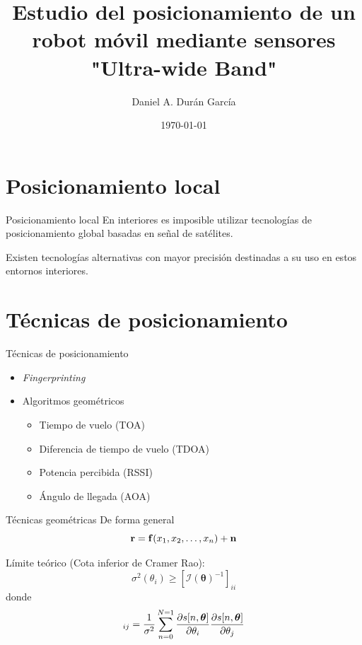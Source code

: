 \documentclass{beamer}
\title{Estudio del posicionamiento de un robot móvil mediante sensores "Ultra-wide Band"}
\date{\today}
\author{Daniel A. Durán García}
\begin{document}
  \maketitle

  \section{Posicionamiento local}
    \begin{frame}{Posicionamiento local}
      En interiores es imposible utilizar tecnologías de posicionamiento global basadas en señal de satélites.

      Existen tecnologías alternativas con mayor precisión destinadas a su uso en estos entornos interiores.
    \end{frame}

  \section{Técnicas de posicionamiento}

    \begin{frame}{Técnicas de posicionamiento}
    \begin{itemize}
      \item \textit{Fingerprinting}
      \item Algoritmos geométricos
      \begin{itemize}
        \item Tiempo de vuelo (TOA)
        \item Diferencia de tiempo de vuelo (TDOA)
        \item Potencia percibida (RSSI)
        \item Ángulo de llegada (AOA)
      \end{itemize}
    \end{itemize}
    \end{frame}

    \begin{frame}{Técnicas geométricas}
    De forma general
      \begin{equation*}\label{eq:geom}
        \vb{r} = \vb{f}(x_1, x_2, \ldots, x_n) + \vb{n}
      \end{equation*}

      Límite teórico (Cota inferior de Cramer Rao):
      \begin{equation*}
        \sigma^2(\theta_i) \geq [\mathcal{I}(\bm{\theta})^{-1}]_{ii}
      \end{equation*}
      donde
      \begin{equation*}
        [\mathcal{I}(\bm{\theta})]_{ij} = \frac{1}{\sigma^2} \sum_{n=0}^{N=1} \pdv{s[n,\bm{\theta}]}{\theta_i}\pdv{s[n,\bm{\theta}]}{\theta_j}
      \end{equation*}
    \end{frame}
\end{document}
